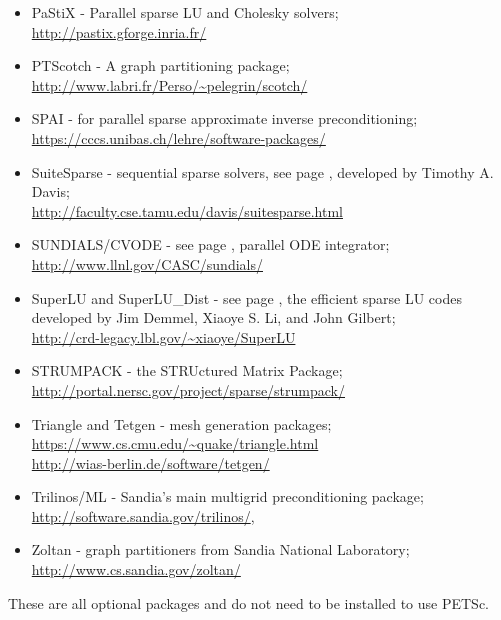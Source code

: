 \begin{itemize}
             \item PaStiX -     Parallel sparse LU and Cholesky solvers; \\\href{http://pastix.gforge.inria.fr/}{http://pastix.gforge.inria.fr/}
             \item PTScotch -    A graph partitioning package; \\\href{http://www.labri.fr/Perso/~pelegrin/scotch/}{http://www.labri.fr/Perso/\~{}pelegrin/scotch/}
  \item SPAI -        for parallel sparse approximate inverse preconditioning;\\ \href{https://cccs.unibas.ch/lehre/software-packages/}{https://cccs.unibas.ch/lehre/software-packages/}
  \item SuiteSparse - sequential sparse solvers, see page \pageref{sec_externalsol}, developed by Timothy A. Davis;\\
                    \href{http://faculty.cse.tamu.edu/davis/suitesparse.html}{http://faculty.cse.tamu.edu/davis/suitesparse.html}
  \item SUNDIALS/CVODE - see page \pageref{sec_sundials}, parallel ODE integrator;\\
                     \href{http://www.llnl.gov/CASC/sundials/}{http://www.llnl.gov/CASC/sundials/}
  \item SuperLU and SuperLU\_Dist - see page \pageref{sec_externalsol},
                    the efficient sparse LU codes developed by Jim Demmel,  Xiaoye S. Li, and John Gilbert;\\
                    \href{http://crd-legacy.lbl.gov/~xiaoye/SuperLU}{http://crd-legacy.lbl.gov/\~{}xiaoye/SuperLU}
                    \item STRUMPACK - the STRUctured Matrix Package; \\
                    \href{http://portal.nersc.gov/project/sparse/strumpack/}{http://portal.nersc.gov/project/sparse/strumpack/}
  \item Triangle and Tetgen - mesh generation packages; \\
    \href{https://www.cs.cmu.edu/~quake/triangle.html}{https://www.cs.cmu.edu/\~{}quake/triangle.html}\\
    \href{http://wias-berlin.de/software/tetgen/}{http://wias-berlin.de/software/tetgen/}
  \item Trilinos/ML - Sandia's main multigrid preconditioning package; \\\href{http://software.sandia.gov/trilinos/}{http://software.sandia.gov/trilinos/},
  \item Zoltan - graph partitioners from Sandia National Laboratory;\\ \href{http://www.cs.sandia.gov/zoltan/}{http://www.cs.sandia.gov/zoltan/}
\end{itemize}
These are all optional packages and do not need to be installed to use PETSc.


